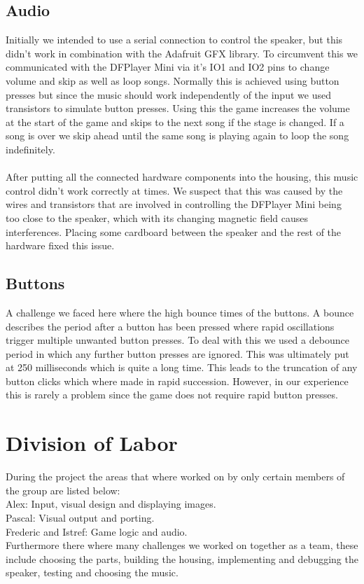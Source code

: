 \documentclass[10pt, a4paper]{article}
\begin{document}
\subsection*{Audio}
Initially we intended to use a serial connection to control the speaker, but this didn't work in combination with the Adafruit GFX library. To circumvent this we communicated with the DFPlayer Mini via it's IO1 and IO2 pins to change volume and skip as well as loop songs. Normally this is achieved using button presses but since the music should work independently of the input we used transistors to simulate button presses. Using this the game increases the volume at the start of the game and skips to the next song if the stage is changed. If a song is over we skip ahead until the same song is playing again to loop the song indefinitely. \\\\
After putting all the connected hardware components into the housing, this music control didn't work correctly at times. We suspect that this was caused by the wires and transistors that are involved in controlling the DFPlayer Mini being too close to the speaker, which with its changing magnetic field causes interferences. Placing some cardboard between the speaker and the rest of the hardware fixed this issue. 

\subsection*{Buttons}
A challenge we faced here where the high bounce times of the buttons. A bounce describes the period after a button has been pressed where rapid oscillations trigger multiple unwanted button presses. To deal with this we used a debounce period in which any further button presses are ignored. This was ultimately put at 250 milliseconds which is quite a long time. This leads to the truncation of any button clicks which where made in rapid succession. However, in our experience this is rarely a problem since the game does not require rapid button presses. 

\section*{Division of Labor}
During the project the areas that where worked on by only certain members of the group are listed below:\\
Alex: Input, visual design and displaying images.\\
Pascal: Visual output and porting.\\
Frederic and Istref: Game logic and audio.\\
Furthermore there where many challenges we worked on together as a team, these include choosing the parts, building the housing, implementing and debugging the speaker, testing and choosing the music.
\end{document}
